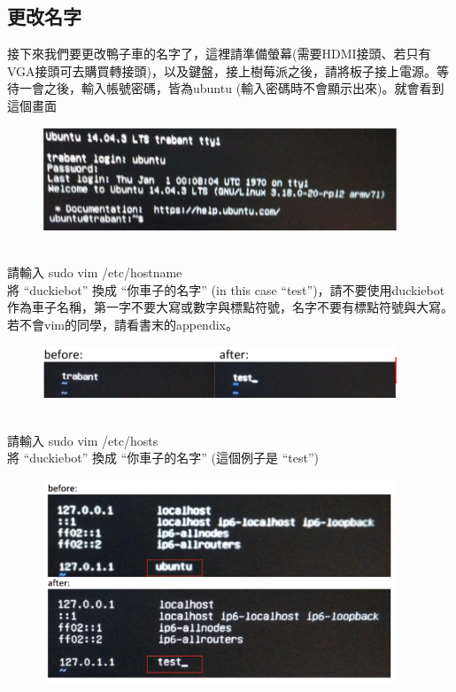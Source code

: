 \documentclass{article}
\begin{document}
\subsection{更改名字}
接下來我們要更改鴨子車的名字了，這裡請準備螢幕(需要HDMI接頭、若只有VGA接頭可去購買轉接頭)，以及鍵盤，接上樹莓派之後，請將板子接上電源。等待一會之後，輸入帳號密碼，皆為ubuntu (輸入密碼時不會顯示出來)。就會看到這個畫面
\\
\begin{figure}[htp]
    \begin{center}
        \includegraphics[width=300pt]{pic/1_3_1.png}
    \end{center}
\end{figure}
\\
請輸入 sudo vim /etc/hostname
\\將 “duckiebot” 換成 “你車子的名字” (in this case “test”)，請不要使用duckiebot作為車子名稱，第一字不要大寫或數字與標點符號，名字不要有標點符號與大寫。若不會vim的同學，請看書末的appendix。
\\
\begin{figure}[htp]
    \begin{center}
        \includegraphics[width=300pt]{pic/1_3_2.png}
    \end{center}
\end{figure}
\\
請輸入 sudo vim /etc/hosts
\\將 “duckiebot” 換成 “你車子的名字” (這個例子是 “test”)
\\
\begin{figure}[htp]
    \begin{center}
        \includegraphics[width=300pt]{pic/1_3_3.png}
    \end{center}
\end{figure}
\end{document}
